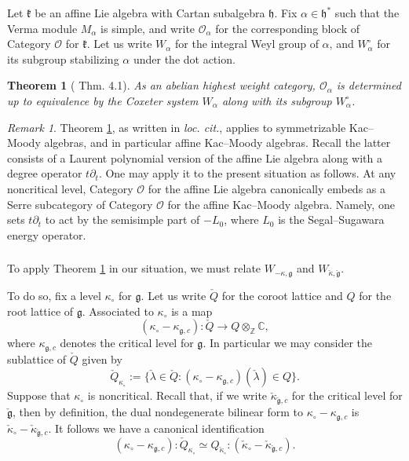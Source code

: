 \documentclass[11pt,reqno]{amsart}
\newcommand{\fg}{\mathfrak{g}}
\newcommand{\OO}{\mathscr{O}}
\newtheorem{theo}[subsubsection]{Theorem}
\theoremstyle{remark}
\newtheorem{re}[subsubsection]{Remark}
\numberwithin{equation}{section}
\newcommand{\fh}{\mathfrak{h}}
\begin{document}
Let $\mathfrak{k}$ be an affine Lie algebra with Cartan subalgebra $\fh$. Fix  
$\alpha \in \fh^*$ such that the Verma module $M_\alpha$ is 
simple, and write $\OO_\alpha$ for the corresponding block of Category 
$\mathscr{O}$ for $\mathfrak{k}$. Let us write $W_\alpha$ for the integral Weyl 
group of $\alpha$, and $W_\alpha^\circ$ for its subgroup stabilizing $\alpha$ 
under the dot action. 


\begin{theo}[\cite{fiebig} Thm. 4.1]\label{t:fiebig} 
As an abelian highest weight 
category, $\OO_\alpha$ is determined up to equivalence by the Coxeter system 
$W_\alpha$ along with its subgroup $W_\alpha^\circ$. \end{theo}


\begin{re} Theorem \ref{t:fiebig}, as written in {\em loc. cit.}, applies to 
symmetrizable Kac--Moody algebras, and in particular affine Kac--Moody algebras. 
Recall the latter consists of a Laurent polynomial version of the affine Lie 
algebra along with a degree operator $t \partial_t$. One may apply it to the 
present situation as follows. At any 
noncritical level, Category $\mathscr{O}$ for the affine Lie algebra 
canonically embeds as a Serre subcategory of Category $\mathscr{O}$ for the 
affine Kac--Moody algebra. Namely, one sets $t \partial_t$ to act by the 
semisimple part of $-L_0$, where $L_0$ is the Segal--Sugawara energy operator.  
\end{re}

\subsubsection{}
To apply Theorem \ref{t:fiebig} in our situation, we must relate $W_{-\kappa, 
\fg}$ and 
$W_{\check{\kappa}, 
\check{\fg}}$.



To do so, fix a level $\kappa_{\circ}$ for $\fg$. Let us write 
$\check{Q}$ for the coroot lattice and $Q$ for the 
root lattice of $\fg$. Associated to $\kappa_\circ$ is a map 
%
\[ (\kappa_\circ - {\kappa_{\fg,c}}): \check{Q} \rightarrow Q 
\otimes_{\mathbb{Z}} 
\mathbb{C},
\]
%
where $\kappa_{\fg, c}$ denotes the critical level for $\fg$. In particular we 
may 
consider 
the 
sublattice of $\check{Q}$ given by 
%
\[
\check{Q}_{\kappa_\circ} := \{ \check{\lambda} \in \check{Q}: (\kappa_\circ - 
\kappa_{\fg, c}) 
(\check{\lambda}) \in Q \}.
\]
%
Suppose that $\kappa_\circ$ is noncritical. Recall that, if we write 
$\check{\kappa}_{\check{\fg}, c}$ for the critical level for $\check{\fg}$, 
then by 
definition, the dual nondegenerate bilinear form to $\kappa_{\circ} - 
\kappa_{\fg, c}$ 
is $\check{\kappa}_\circ - \check{\kappa}_{\check{\fg},c}$. It follows we have 
a canonical identification
%
\begin{equation} \label{e:coxeq3} (\kappa_\circ - \kappa_{\fg, c}):  
\check{Q}_{\kappa_\circ} 
\simeq Q_{\check{\kappa}_\circ}: 
(\check{\kappa}_\circ - \check{\kappa}_{\check{\fg}, c}).
\end{equation}
%
\end{document}
